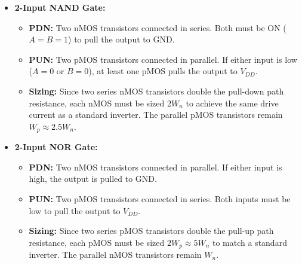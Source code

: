 \documentclass[12pt,a4paper]{article}
\begin{document}
\begin{itemize}[leftmargin=*, itemsep=4pt]
  \item \textbf{2-Input NAND Gate:}
    \begin{itemize}
      \item \textbf{PDN:} Two nMOS transistors connected in series. Both must be ON ($A = B = 1$) to pull the output to GND.
      \item \textbf{PUN:} Two pMOS transistors connected in parallel. If either input is low ($A=0$ or $B=0$), at least one pMOS pulls the output to $V_{DD}$.
      \item \textbf{Sizing:} Since two series nMOS transistors double the pull-down path resistance, each nMOS must be sized $2W_n$ to achieve the same drive current as a standard inverter. The parallel pMOS transistors remain $W_p \approx 2.5W_n$.
    \end{itemize}
  \item \textbf{2-Input NOR Gate:}
    \begin{itemize}
      \item \textbf{PDN:} Two nMOS transistors connected in parallel. If either input is high, the output is pulled to GND.
      \item \textbf{PUN:} Two pMOS transistors connected in series. Both inputs must be low to pull the output to $V_{DD}$.
      \item \textbf{Sizing:} Since two series pMOS transistors double the pull-up path resistance, each pMOS must be sized $2W_p \approx 5W_n$ to match a standard inverter. The parallel nMOS transistors remain $W_n$.
    \end{itemize}
\end{itemize}
\end{document}
